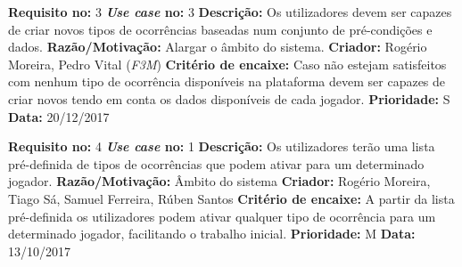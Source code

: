 \newpage

\begin{framed}
\noindent\textbf{Requisito no:} 3
\qquad
\textbf{\emph{Use case} no:} 3
\vspace{2mm}
\newline\textbf{Descrição:} Os utilizadores devem ser capazes de criar novos tipos de ocorrências baseadas num conjunto de pré-condições e dados.
\vspace{1mm}
\newline\textbf{Razão/Motivação:} Alargar o âmbito do sistema.
\vspace{1mm}
\newline\textbf{Criador:} Rogério Moreira, Pedro Vital (\emph{F3M})
\vspace{1mm}
\newline\textbf{Critério de encaixe:} Caso não estejam satisfeitos com nenhum tipo de ocorrência disponíveis na plataforma devem ser capazes de criar novos tendo em conta os dados disponíveis de cada jogador.
\vspace{1mm}
\newline\textbf{Prioridade:} S
\vspace{1mm}
\newline\textbf{Data:} 20/12/2017
\end{framed}

\begin{framed}
\noindent\textbf{Requisito no:} 4
\qquad
\textbf{\emph{Use case} no:} 1
\vspace{2mm}
\newline\textbf{Descrição:} Os utilizadores terão uma lista pré-definida de tipos de ocorrências que podem ativar para um determinado jogador.
\vspace{1mm}
\newline\textbf{Razão/Motivação:} Âmbito do sistema
\vspace{1mm}
\newline\textbf{Criador:} Rogério Moreira, Tiago Sá, Samuel Ferreira, Rúben Santos
\vspace{1mm}
\newline\textbf{Critério de encaixe:} A partir da lista pré-definida os utilizadores podem ativar qualquer tipo de ocorrência para um determinado jogador, facilitando o trabalho inicial.
\vspace{1mm}
\newline\textbf{Prioridade:} M
\vspace{1mm}
\newline\textbf{Data:} 13/10/2017
\end{framed}

